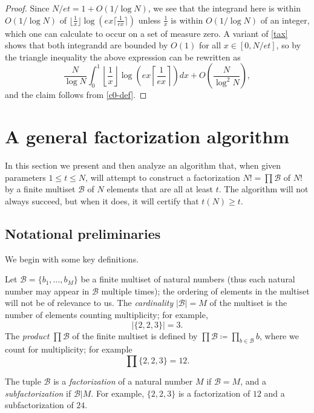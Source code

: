 \documentclass[12pt,a4paper,reqno]{amsart}
\numberwithin{equation}{section}
\theoremstyle{plain}
\theoremstyle{definition}
\newcommand\tuple{{\mathcal B}}
\begin{document}
\begin{proof}
Since $N/et = 1 + O(1/\log N)$, we see that the integrand here is within $O(1/\log N)$ of $\lfloor \frac{1}{x} \rfloor \log \left( e x \lceil \frac{1}{e x} \rceil \right)$ unless $\frac{1}{x}$ is within $O(1/\log N)$ of an integer, which one can calculate to occur on a set of measure zero.  A variant of \eqref{tax} shows that both integrandd are bounded by $O(1)$ for all $x \in [0,N/et]$, so by the triangle inequality the above expression can be rewritten as
$$ \frac{N}{\log N} \int_0^1 \left\lfloor \frac{1}{x} \right\rfloor \log \left( e x \left\lceil \frac{1}{e x} \right\rceil \right) dx + O\left( \frac{N}{\log^2 N}\right),$$
and the claim follows from \eqref{c0-def}.
\end{proof}



\section{A general factorization algorithm}

In this section we present and then analyze an algorithm that, when given parameters $1 \leq t \leq N$, will attempt to construct a factorization $N! = \prod \tuple$ of $N!$ by a finite multiset $\tuple$ of $N$ elements that are all at least $t$.  The algorithm will not always succeed, but when it does, it will certify that $t(N) \geq t$.

\subsection{Notational preliminaries}

We begin with some key definitions.

Let $\tuple = \{ b_1,\dots,b_M\}$ be a finite multiset of natural numbers (thus each natural number may appear in $\tuple$ multiple times); the ordering of elements in the multiset will not be of relevance to us.  The \emph{cardinality} $|\tuple| = M$ of the multiset is the number of elements counting multiplicity; for example,
$$ |\{ 2,2,3\}| = 3.$$
The \emph{product} $\prod \tuple$ of the finite multiset is defined by $\prod \tuple \coloneqq \prod_{b \in \tuple} b$, where we count for multiplicity; for example
$$ \prod \{2,2,3\} = 12.$$

The tuple $\tuple$ is a \emph{factorization} of a natural number $M$ if $\tuple = M$, and a \emph{subfactorization} if $\tuple | M$.  For example, $\{2,2,3\}$ is a factorization of $12$ and a subfactorization of $24$.
\end{document}
